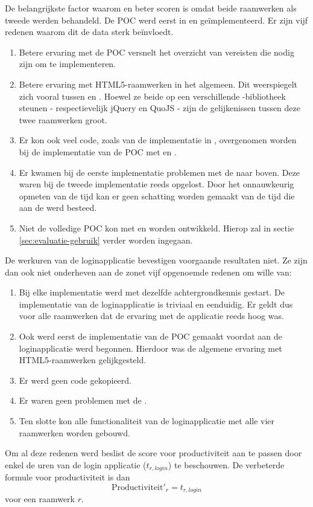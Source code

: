 De belangrijkste factor waarom \lungo{} en \kendo{} beter scoren is omdat beide raamwerken als tweede werden behandeld.
De POC werd eerst in \jqm{} en \st{} geïmplementeerd.
Er zijn vijf redenen waarom dit de data sterk beïnvloedt.
\begin{enumerate}
\item Betere ervaring met de POC versnelt het overzicht van vereisten die nodig zijn om te implementeren. 
\item Betere ervaring met HTML5-raamwerken in het algemeen. 
Dit weerspiegelt zich vooral tussen \jqm{} en \lungo{}.
Hoewel ze beide op een verschillende \js{}-bibliotheek steunen - respectievelijk jQuery en QuoJS - zijn de gelijkenissen tussen deze twee raamwerken groot.
\item Er kon ook veel code,  zoals van de implementatie in \jqm{},  overgenomen worden bij de implementatie van de POC met \lungo{} en \kendo{}.
\item Er kwamen bij de eerste implementatie problemen met de  naar boven.
Deze waren bij de tweede implementatie reeds opgelost.
Door het onnauwkeurig opmeten van de tijd kan er geen schatting worden gemaakt van de tijd die aan de  werd besteed.
\item Niet de volledige POC kon met \lungo{} en \st{} worden ontwikkeld.
Hierop zal in sectie \ref{sec:evaluatie-gebruik} verder worden ingegaan.
\end{enumerate}
De werkuren van de loginapplicatie bevestigen voorgaande resultaten niet.
Ze zijn dan ook niet onderheven aan de zonet vijf opgenoemde redenen om wille van:
\begin{enumerate}
\item Bij elke implementatie werd met dezelfde achtergrondkennis gestart.  
De implementatie van de loginapplicatie is triviaal en eenduidig.
Er geldt dus voor alle raamwerken dat de ervaring met de applicatie reeds hoog was.
\item Ook werd eerst de implementatie van de POC gemaakt voordat aan de loginapplicatie werd begonnen.
Hierdoor was de algemene ervaring met HTML5-raamwerken gelijkgesteld.
\item Er werd geen code gekopieerd. 
\item Er waren geen problemen met de .
\item Ten slotte kon alle functionaliteit van de loginapplicatie met alle vier raamwerken worden gebouwd.
\end{enumerate}
Om al deze redenen werd beslist de score voor productiviteit aan te passen door enkel de uren van de login applicatie ($t_{r,login}$) te beschouwen.
De verbeterde formule voor productiviteit is dan
\begin{equation}
  \text{Productiviteit}'_r = t_{r,login}
  \label{eq:productiviteit-enhanced}
\end{equation}
voor een raamwerk $r$.

